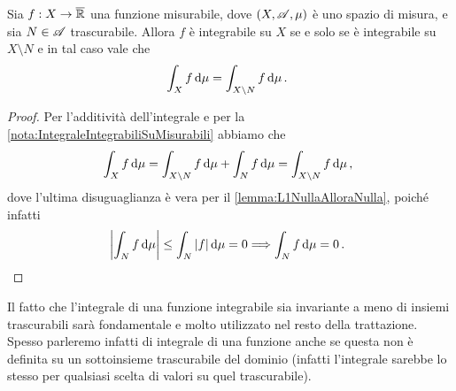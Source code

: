 \begin{corollary}\label{cor:IntegraleAMenoDiTrascurabili}
	Sia $f:X\to\overline{\mathbb R}$ una funzione misurabile, dove $(X,\mathscr A,\mu)$ è uno spazio di misura, e sia $N\in\mathscr A$ trascurabile. Allora $f$ è integrabile su $X$ se e solo se è integrabile su $X\setminus N$ e in tal caso vale che
	\begin{equation*}
		\int_X f\,\mathrm d\mu=\int_{X\setminus N}f\,\mathrm d\mu\, \text{. }
	\end{equation*}
\end{corollary}
\begin{proof}
	Per l'additività dell'integrale e per la \cref{nota:IntegraleIntegrabiliSuMisurabili} abbiamo che
	\begin{equation*}
		\int_X f\,\mathrm d\mu=\int_{X\setminus N} f \,\mathrm d\mu+\int_N f\,\mathrm d\mu=\int_{X\setminus N}f\,\mathrm d\mu\, \text{, }
	\end{equation*}
	dove l'ultima disuguaglianza è vera per il \cref{lemma:L1NullaAlloraNulla}, poiché infatti
	\begin{equation*}
		\left|\int_N f\,\mathrm d\mu\right|\le \int_N |f|\,\mathrm d\mu=0 \Longrightarrow \int_N f\,\mathrm d\mu=0\, \text{. }
	\end{equation*}
\end{proof}


Il fatto che l'integrale di una funzione integrabile sia invariante a meno di insiemi trascurabili sarà fondamentale e molto utilizzato nel resto della trattazione. Spesso parleremo infatti di integrale di una funzione anche se questa non è definita su un sottoinsieme trascurabile del dominio (infatti l'integrale sarebbe lo stesso per qualsiasi scelta di valori su quel trascurabile).


